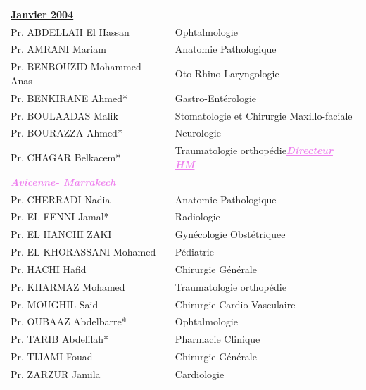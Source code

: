 \begin{table}[H]
  \begin{tabular}{l l}
   \multicolumn{2}{l}{\textbf{\underline{Janvier 2004}}}\vspace*{0.5em}\\
   Pr. ABDELLAH El Hassan & \hspace*{2em} Ophtalmologie\\
   Pr. AMRANI Mariam & \hspace*{2em} Anatomie Pathologique   \\
   Pr. BENBOUZID Mohammed Anas & \hspace*{2em} Oto-Rhino-Laryngologie \\
   Pr. BENKIRANE Ahmed*	& \hspace*{2em} Gastro-Entérologie \\
   Pr. BOULAADAS Malik & \hspace*{2em} Stomatologie et Chirurgie Maxillo-faciale\\
   Pr. BOURAZZA Ahmed* &  \hspace*{2em} Neurologie\\
   Pr. CHAGAR Belkacem* &  \hspace*{2em} Traumatologie orthopédie\textcolor{violet}{\textbf{\emph{\underline{Directeur HM }}}}  \\
   \textcolor{violet}{\textbf{\emph{\underline{Avicenne- Marrakech}}}}\\
   Pr. CHERRADI Nadia	& \hspace*{2em} Anatomie Pathologique\\
   Pr. EL FENNI Jamal*	& \hspace*{2em} Radiologie \\
   Pr. EL HANCHI ZAKI	& \hspace*{2em} Gynécologie Obstétriquee \\
   Pr. EL KHORASSANI Mohamed	& \hspace*{2em} Pédiatrie \\
   Pr. HACHI Hafid	& \hspace*{2em} Chirurgie Générale \\
   Pr. KHARMAZ Mohamed& \hspace*{2em} Traumatologie orthopédie \\
   Pr. MOUGHIL Said	& \hspace*{2em} Chirurgie Cardio-Vasculaire \\
   Pr. OUBAAZ Abdelbarre*	& \hspace*{2em} Ophtalmologie \\
   Pr. TARIB Abdelilah*	& \hspace*{2em} Pharmacie Clinique \\
   Pr. TIJAMI Fouad	& \hspace*{2em} Chirurgie Générale \\
   Pr. ZARZUR Jamila & \hspace*{2em} Cardiologie \\

  \end{tabular}
  
  \end{table}

